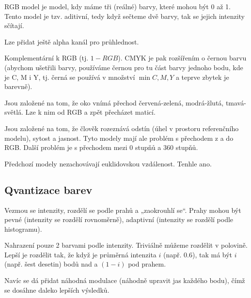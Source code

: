 \documentclass[12pt]{article}					%
\begin{document}
\begin{definice}
	RGB model je model, kdy máme tři (reálné) barvy, které mohou být 0 až 1. Tento model je tzv. aditivní, tedy když sečteme dvě barvy, tak se jejich intenzity sčítají.

	Lze přidat ještě alpha kanál pro průhlednost.
\end{definice}

\begin{definice}
	Komplementární k RGB (tj. $1 - RGB$). CMYK je pak rozšířením o černou barvu (abychom ušetřili barvy, používáme černou pro tu část barvy jednoho bodu, kde je C, M i Y, tj. černá se používá v množství $\min C, M, Y$ a teprve zbytek je barevně).
\end{definice}

\begin{definice}
	Jsou založené na tom, že oko vnímá přechod červená-zelená, modrá-žlutá, tmavá-světlá. Lze k nim od RGB a zpět přecházet maticí.
\end{definice}

\begin{definice}
	Jsou založené na tom, že člověk rozeznává odstín (úhel v prostoru referenčního modelu), sytost a jasnost. Tyto modely mají ale problém s přechodem z a do RGB. Další problém je s přechodem mezi $0$ stupňů a $360$ stupňů.
\end{definice}

\begin{definice}[L*a*b*]
	Předchozí modely nezachovávají euklidovskou vzdálenost. Tenhle ano.
\end{definice}

\subsection{Qvantizace barev}
\begin{definice}[Prahování]
	Vezmou se intenzity, rozdělí se podle prahů a „zaokrouhlí se“. Prahy mohou být pevné (intenzity se rozdělí rovnoměrně), adaptivní (intenzity se rozdělí podle histogramu).
\end{definice}

\begin{definice}[Binarizace]
	Nahrazení pouze 2 barvami podle intenzity. Triviálně můžeme rozdělit v polovině. Lepší je rozdělit tak, že když je průměrná intenzita $i$ (např. $0.6$), tak má být $i$ (např. šest desetin) bodů nad a $(1 - i)$ pod prahem.

	Navíc se dá přidat náhodná modulace (náhodně upravit jas každého bodu), čímž se dosáhne daleko lepších výsledků.
\end{definice}
\end{document}
